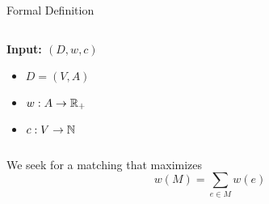 \begin{frame}{Formal Definition}
\begin{columns}

\begin{column}{.45\textwidth}
\textbf{Input: $(D, w, c)$}
\begin{itemize}
\item<1> $D=(V,A)$
\item<2> $w:A \to \mathbb{R}_+$
\item<3> $c:V \to \mathbb{N}$
\end{itemize}

\end{column}

\begin{column}{.55\textwidth}
\centering

\end{column}
\end{columns}

\vfill
{}
We seek for a matching that maximizes
$$w(M) = \sum_{e \in M}{w(e)}$$

\end{frame}